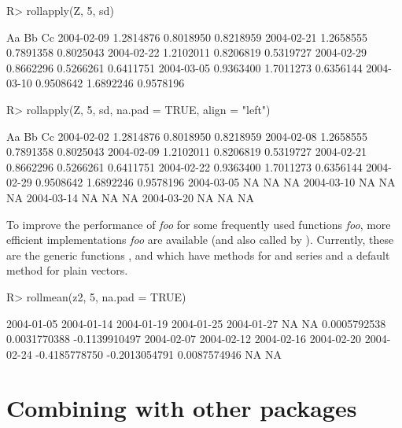 \documentclass{Z}
\begin{document}
\begin{Schunk}
\begin{Sinput}
R> rollapply(Z, 5, sd)
\end{Sinput}
\begin{Soutput}
                  Aa        Bb        Cc
2004-02-09 1.2814876 0.8018950 0.8218959
2004-02-21 1.2658555 0.7891358 0.8025043
2004-02-22 1.2102011 0.8206819 0.5319727
2004-02-29 0.8662296 0.5266261 0.6411751
2004-03-05 0.9363400 1.7011273 0.6356144
2004-03-10 0.9508642 1.6892246 0.9578196
\end{Soutput}
\begin{Sinput}
R> rollapply(Z, 5, sd, na.pad = TRUE, align = "left")
\end{Sinput}
\begin{Soutput}
                  Aa        Bb        Cc
2004-02-02 1.2814876 0.8018950 0.8218959
2004-02-08 1.2658555 0.7891358 0.8025043
2004-02-09 1.2102011 0.8206819 0.5319727
2004-02-21 0.8662296 0.5266261 0.6411751
2004-02-22 0.9363400 1.7011273 0.6356144
2004-02-29 0.9508642 1.6892246 0.9578196
2004-03-05        NA        NA        NA
2004-03-10        NA        NA        NA
2004-03-14        NA        NA        NA
2004-03-20        NA        NA        NA
\end{Soutput}
\end{Schunk}

To improve the performance of \textit{foo}\code{)} for some frequently
used functions \textit{foo}, more efficient implementations \textit{foo}
are available (and also called by ). 
Currently, these are the generic functions , 
and  which have methods for  and  series and a 
default method for plain vectors.

\begin{Schunk}
\begin{Sinput}
R> rollmean(z2, 5, na.pad = TRUE)
\end{Sinput}
\begin{Soutput}
   2004-01-05    2004-01-14    2004-01-19    2004-01-25    2004-01-27 
           NA            NA  0.0005792538  0.0031770388 -0.1139910497 
   2004-02-07    2004-02-12    2004-02-16    2004-02-20    2004-02-24 
-0.4185778750 -0.2013054791  0.0087574946            NA            NA 
\end{Soutput}
\end{Schunk}


\section[Combining zoo with other packages]{Combining  with other packages}
\label{sec:combining}
\end{document}

